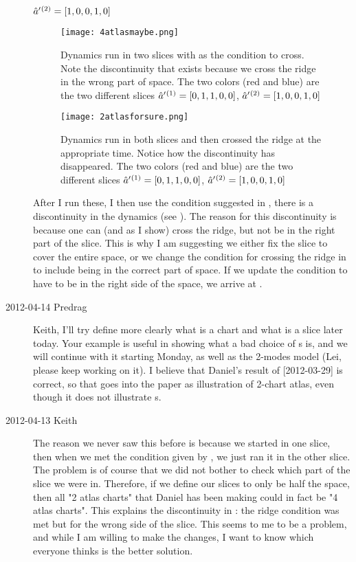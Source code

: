 \begin{description}
\begin{center}
$\hat{a}'{}^{(2)} = [1, 0, 0, 1, 0]$
    \end{center}
     \begin{figure}
 \begin{center}
 \texttt{[image: 4atlasmaybe.png]}
 \end{center}
 \caption{Dynamics run in two slices with  as the
 condition to cross.  Note the discontinuity that exists because we cross
 the ridge in the wrong part of space.  The two colors (red and blue) are
 the two different slices $\hat{a}'{}^{(1)} = [0, 1, 1, 0, 0]$,
 $\hat{a}'{}^{(2)} = [1, 0, 0, 1, 0]$}{\label{fig:4chart}}
 \end{figure}
 \begin{figure}
 \begin{center}
 \texttt{[image: 2atlasforsure.png]}
 \end{center}
 \caption{Dynamics run in both slices and then crossed the ridge at the
 appropriate time.  Notice how the discontinuity has disappeared.  The
 two colors (red and blue) are the two different slices $\hat{a}'{}^{(1)}
 = [0, 1, 1, 0, 0]$, $\hat{a}'{}^{(2)} = [1, 0, 0, 1, 0]$
} {\label{fig:true2chart}}
 \end{figure}

After I run these, I then use the condition suggested in
, there is a discontinuity in the dynamics (see
).  The reason for this discontinuity is because one
can (and as I show) cross the ridge, but not be in the right part of the
slice.  This is why I am suggesting we either fix the slice to cover the
entire space, or we change the condition for crossing the ridge in
 to include being in the correct part of space.  If
we update the condition to have to be in the right side of the space, we
arrive at .

\item[2012-04-14 Predrag] Keith, I'll try define more clearly what is a
chart and what is a slice later today. Your example is useful in showing
what a bad choice of \template s is, and we will continue with it
starting Monday, as well as the 2-modes model (Lei, please keep working
on it). I believe that Daniel's result of [2012-03-29] is correct, so
that goes into the paper as illustration of 2-chart atlas, even though it
does not illustrate \chartBord s.

\item[2012-04-13 Keith]
The reason we never saw this before is because we started in one slice,
then when we met the condition given by , we just ran
it in the other slice. The problem is of course that we did not bother to
check which part of the slice we were in.  Therefore, if we define our
slices to only be half the space, then all "2 atlas charts" that Daniel
has been making could in fact be "4 atlas charts".  This explains the
discontinuity in : the ridge condition was met but for
the wrong side of the slice.  This seems to me to be a problem, and while
I am willing to make the changes, I want to know which everyone thinks is
the better solution.


\end{description}
